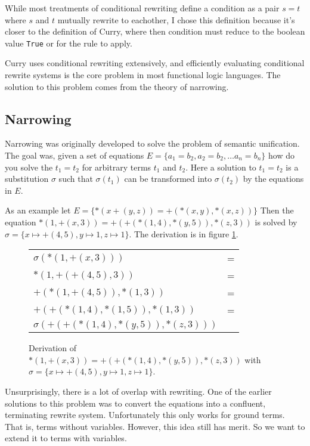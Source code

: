 \documentclass{article}
\theoremstyle{definition}
\begin{document}
While most treatments of conditional rewriting \cite{IntegrationFunLog,condKaplan}
define a condition as a pair $s = t$ where $s$ and $t$ mutually rewrite to eachother,
I chose this definition because it's closer to the definition of Curry, where then condition must
reduce to the boolean value \texttt{True} or for the rule to apply.

Curry uses conditional rewriting extensively,
and efficiently evaluating conditional rewrite systems is the core problem in most functional logic languages.
The solution to this problem comes from the theory of narrowing.


\subsection{Narrowing}

Narrowing was originally developed to solve the problem of semantic unification.
The goal was, given a set of equations $E = \{a_1 = b_2, a_2 = b_2, \ldots a_n = b_n\}$ 
how do you solve the $t_1 = t_2$ for arbitrary terms $t_1$ and $t_2$.
Here a solution to $t_1 = t_2$ is a substitution $\sigma$ such that $\sigma(t_1)$
can be transformed into $\sigma(t_2)$ by the equations in $E$.

As an example let $E = \{*(x +(y, z)) = +(*(x,y), *(x,z))\}$
Then the equation $*(1,+(x,3)) = +(+(*(1,4), *(y,5)), *(z,3))$
is solved by $\sigma = \{x \mapsto +(4,5), y \mapsto 1, z \mapsto 1\}$.
The derivation is in figure \ref{fig:narrow}.

\begin{figure}[h]
\begin{tabular}{ll}
    $\sigma(*(1,+(x,3)))$                & = \\
    $*(1,+(+(4,5),3))$                   & = \\
    $+(*(1,+(4,5)),*(1,3))$              & = \\
    $+(+(*(1,4),*(1,5)),*(1,3))$         & = \\
    $\sigma(+(+(*(1,4),*(y,5)),*(z,3)))$ &
\end{tabular}
    \caption{Derivation of $*(1,+(x,3)) = +(+(*(1,4), *(y,5)), *(z,3))$ with
    $\sigma = \{x \mapsto +(4,5), y \mapsto 1, z \mapsto 1\}$.}
    \label{fig:narrow}
\end{figure}

Unsurprisingly, there is a lot of overlap with rewriting.
One of the earlier solutions to this problem was to convert 
the equations into a confluent, terminating rewrite system. \cite{KnuthBendix}
Unfortunately this only works for ground terms.  That is, terms without variables.
However, this idea still has merit.
So we want to extend it to terms with variables.
\end{document}

